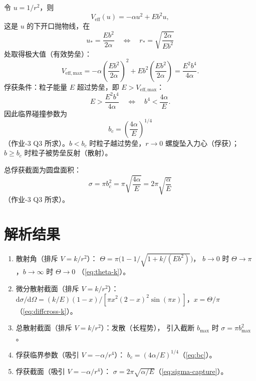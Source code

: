 \documentclass[UTF8,a4paper,11pt]{ctexart}
\begin{document}
令 $u=1/r^2$，则
\begin{equation}
  V_{\mathrm{eff}}(u)=-\alpha u^2+Eb^2 u,
\end{equation}
这是 $u$ 的下开口抛物线，在
\begin{equation}
  u_*=\frac{Eb^2}{2\alpha}
  \quad\Longleftrightarrow\quad
  r_*=\sqrt{\frac{2\alpha}{Eb^2}}
\end{equation}
处取得极大值（有效势垒）：
\begin{equation}
  V_{\mathrm{eff,max}}
  = -\alpha\left(\frac{Eb^2}{2\alpha}\right)^2
    + Eb^2\left(\frac{Eb^2}{2\alpha}\right)
  = \frac{E^2 b^4}{4\alpha}.
\end{equation}
俘获条件：粒子能量 $E$ 超过势垒，即 $E>V_{\mathrm{eff,max}}$：
\begin{equation}
  E > \frac{E^2 b^4}{4\alpha}
  \quad\Longleftrightarrow\quad
  b^4 < \frac{4\alpha}{E}.
\end{equation}
因此临界碰撞参数为
\begin{equation}
  \boxed{\;b_c=\left(\frac{4\alpha}{E}\right)^{1/4}\;}
  \label{eq:bc}
\end{equation}
（作业-3 Q3 所求）。$b<b_c$ 时粒子越过势垒，$r\to0$ 螺旋坠入力心（俘获）；
$b\ge b_c$ 时粒子被势垒反射（散射）。

总俘获截面为圆盘面积：
\begin{equation}
  \boxed{\;\sigma=\pi b_c^2
  =\pi\sqrt{\frac{4\alpha}{E}}
  =2\pi\sqrt{\frac{\alpha}{E}}\;}
  \label{eq:sigma-capture}
\end{equation}
（作业-3 Q3 所求）。

\section{解析结果}
\label{sec:result}

\begin{enumerate}
  \item 散射角（排斥 $V=k/r^2$）：
        $\Theta=\pi\bigl(1-1/\sqrt{1+k/(Eb^2)}\bigr)$，
        $b\to0$ 时 $\Theta\to\pi$，$b\to\infty$ 时 $\Theta\to0$
        （\eqref{eq:theta-k}）。
  \item 微分散射截面（排斥 $V=k/r^2$）：
        $\mathrm d\sigma/\mathrm d\Omega
        =(k/E)(1-x)/[\pi x^2(2-x)^2\sin(\pi x)]$，$x=\Theta/\pi$
        （\eqref{eq:diffcross-k}）。
  \item 总散射截面（排斥 $V=k/r^2$）：发散（长程势），
        引入截断 $b_{\max}$ 时 $\sigma=\pi b_{\max}^2$。
  \item 俘获临界参数（吸引 $V=-\alpha/r^4$）：
        $b_c=(4\alpha/E)^{1/4}$（\eqref{eq:bc}）。
  \item 俘获截面（吸引 $V=-\alpha/r^4$）：
        $\sigma=2\pi\sqrt{\alpha/E}$（\eqref{eq:sigma-capture}）。
\end{enumerate}
\end{document}
